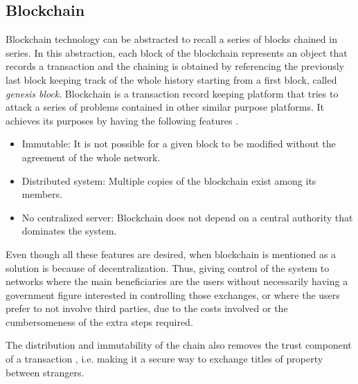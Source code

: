\subsection{Blockchain}

Blockchain technology can be abstracted to recall a series of blocks chained in series. In this abstraction, each block of the blockchain represents an object that records a transaction and the chaining is obtained by referencing the previously last block keeping track of the whole history starting from a first block, called \textit{genesis block}. Blockchain is a transaction record keeping platform that tries to attack a series of problems contained in other similar purpose platforms. It achieves its purposes by having the following features \cite{block}.

\begin{itemize}
\item Immutable: It is not possible for a given block to be modified without the agreement of the whole network.
\item Distributed system: Multiple copies of the blockchain exist among its members.
\item No centralized server: Blockchain does not depend on a central authority that dominates the system.            
\end{itemize}
Even though all these features are desired, when blockchain is mentioned as a solution is because of decentralization. Thus, giving control of the system to networks where the main beneficiaries are the users without necessarily having a government figure interested in controlling those exchanges, or where the users prefer to not involve third parties, due to the costs involved or the cumbersomeness of the extra steps required. 

The distribution and immutability of the chain also removes the trust component of a transaction \cite{iot}, i.e. making it a secure way to exchange titles of property between strangers.
